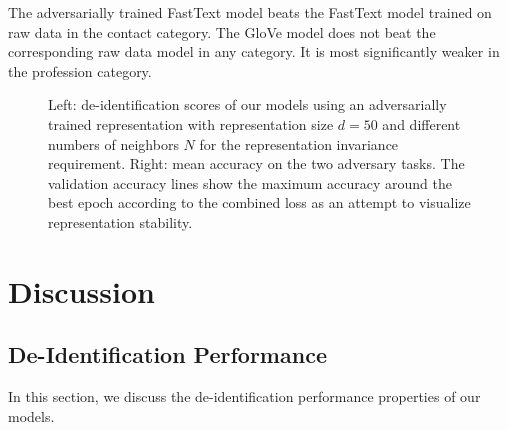 %
The adversarially trained FastText model beats the FastText model trained on raw data in the contact category. 
%
The GloVe model does not beat the corresponding raw data model in any category.
%
It is most significantly weaker in the profession category.

\begin{figure*}
    \centering
    
    \caption[De-identification with adversarially learned representations]{%
        Left: de-identification \fone scores of our models using an adversarially trained representation with representation size $d=50$ and different numbers of neighbors $N$ for the representation invariance requirement.
        Right: mean accuracy on the two adversary tasks.
        The validation accuracy lines show the maximum accuracy around the best epoch according to the combined loss as an attempt to visualize representation stability.
    }\label{fig:adversarial-deid}
\end{figure*}

\section{Discussion}\label{sec:discussion}

\subsection{De-Identification Performance}
%
In this section, we discuss the de-identification performance properties of our models.

